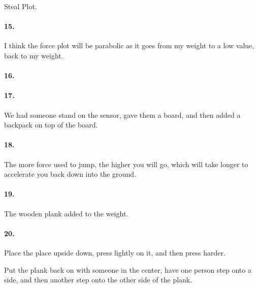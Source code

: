         \begin{mdframed}
            Steal Plot.
        \end{mdframed}

        \paragraph*{15.}

        \begin{mdframed}
            I think the force plot will be parabolic as it goes from my weight to a low value, back to my weight.
        \end{mdframed}

        \paragraph*{16.}

        \begin{mdframed}
            
        \end{mdframed}

        \paragraph*{17.}

        \begin{mdframed}
            We had someone stand on the sensor, gave them a board, and then added a backpack on top of the board.
        \end{mdframed}

        \paragraph*{18.}

        \begin{mdframed}
            The more force used to jump, the higher you will go, which will take longer to accelerate you back down into the ground.
        \end{mdframed}

        \paragraph*{19.}

        \begin{mdframed}
            The wooden plank added to the weight.
        \end{mdframed}

        \paragraph*{20.}

        \begin{mdframed}
            Place the place upside down, press lightly on it, and then press harder.

            Put the plank back on with someone in the center, have one person step onto a side, and then another step onto the other side of the plank.
        \end{mdframed}

